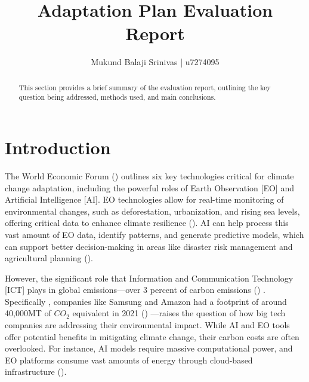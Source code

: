 \documentclass[12pt]{article}
\title{Adaptation Plan Evaluation Report}
\author{Mukund Balaji Srinivas | u7274095}
\date{} %
\begin{document}
\maketitle

\begin{abstract}
This section provides a brief summary of the evaluation report, outlining the key question being addressed, methods used, and main conclusions.
\end{abstract}

\newpage

\section*{Introduction}

The World Economic Forum (\cite{masterson_2024})  outlines six key technologies critical 
for climate change adaptation, including the powerful roles of Earth Observation [EO] 
and Artificial Intelligence [AI]. EO technologies allow for real-time monitoring of 
environmental changes, such as deforestation, urbanization, and rising sea levels, offering 
critical data to enhance climate resilience (\cite{anderson_2017}). AI can help process this vast amount of EO data, identify patterns, and generate predictive models, which can support better decision-making in areas like disaster risk management and agricultural planning (\cite{Huntingford_2019}).

However, the significant role that Information and Communication Technology [ICT] 
plays in global emissions—over 3 percent of carbon emissions (\cite{jones_2018}) . Specifically , 
companies like Samsung and Amazon had a footprint of around 40,000MT of \(CO_2\) equivalent in 2021 (\cite{navarro_2023_the}) —raises the question of how big tech companies are addressing their environmental impact. While AI and EO tools offer potential benefits in mitigating climate change, their carbon costs are often overlooked. For instance, AI models require massive computational power, and EO platforms consume vast amounts of energy through cloud-based infrastructure (\cite{taddeo_2021}).
\end{document}
